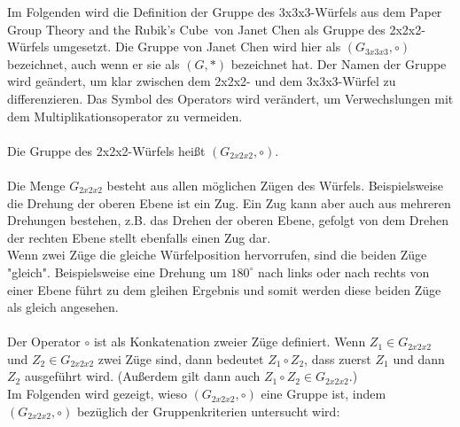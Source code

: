 \documentclass[12pt,a4paper, usenames, dvipsnames]{article}
\begin{document}
Im Folgenden wird die Definition der Gruppe des 3x3x3-Würfels aus dem Paper \glqq Group Theory and the Rubik's Cube\grqq \  von Janet Chen \cite{JC} als Gruppe des 2x2x2-Würfels umgesetzt. Die Gruppe von Janet Chen wird hier als $(G_{3x3x3}, \circ)$ bezeichnet, auch wenn er sie als $(G, *)$ bezeichnet hat. Der Namen der Gruppe wird geändert, um klar zwischen dem 2x2x2- und dem 3x3x3-Würfel zu differenzieren. Das Symbol des Operators wird verändert, um Verwechslungen mit dem Multiplikationsoperator zu vermeiden. \\
\\ 
Die Gruppe des 2x2x2-Würfels heißt $(G_{2x2x2}, \circ)$. \\
\\
Die Menge $G_{2x2x2}$ besteht aus allen möglichen Zügen des Würfels. Beispielsweise die Drehung der oberen Ebene ist ein Zug. Ein Zug kann aber auch aus mehreren Drehungen bestehen, z.B. das Drehen der oberen Ebene, gefolgt von dem Drehen der rechten Ebene stellt ebenfalls einen Zug dar. \\
Wenn zwei Züge die gleiche Würfelposition hervorrufen, sind die beiden Züge "gleich". Beispielsweise eine Drehung um $180^{\circ}$ nach links oder nach rechts von einer Ebene führt zu dem gleihen Ergebnis und somit werden diese beiden Züge als gleich angesehen. \\
\\
Der Operator $\circ$ ist als Konkatenation zweier Züge definiert. Wenn $Z_1 \in G_{2x2x2}$ und $Z_2 \in G_{2x2x2}$ zwei Züge sind, dann bedeutet $Z_1 \circ Z_2$, dass zuerst $Z_1$ und dann $Z_2$ ausgeführt wird. (Außerdem gilt dann auch $Z_1 \circ Z_2 \in G_{2x2x2}$.) \\
Im Folgenden wird gezeigt, wieso $(G_{2x2x2}, \circ)$ eine Gruppe ist, indem $(G_{2x2x2}, \circ)$ bezüglich der Gruppenkriterien untersucht wird: \\
\end{document}
